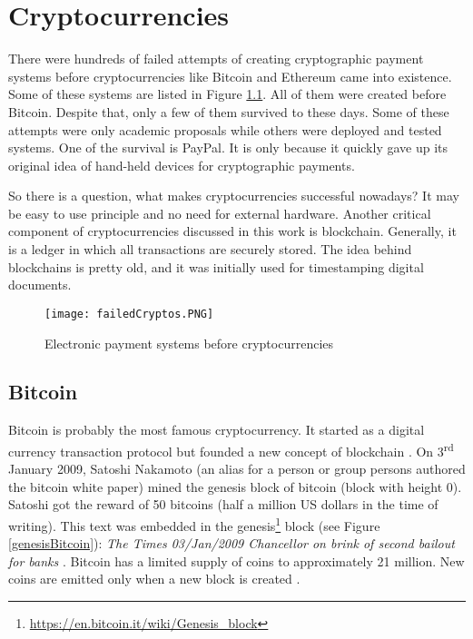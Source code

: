 \chapter{Cryptocurrencies}
\label{Cryptocurrencies}

There were hundreds of failed attempts of creating cryptographic payment systems before cryptocurrencies like Bitcoin and Ethereum came into existence. Some of these systems are listed in Figure \ref{paymentSystems}. All of them were created before Bitcoin. Despite that, only a few of them survived to these days. Some of these attempts were only academic proposals while others were deployed and tested systems. One of the survival is PayPal. It is only because it quickly gave up its original idea of hand-held devices for cryptographic payments. \cite{wayner1997digital}

So there is a question, what makes cryptocurrencies successful nowadays?  It may be easy to use principle and no need for external hardware. 
Another critical component of cryptocurrencies discussed in this work is blockchain. Generally, it is a ledger in which all transactions are securely stored. The idea behind blockchains is pretty old, and it was initially used for timestamping digital documents. \cite{haber1990time} 


\begin{figure}[h]
    \centering
    \texttt{[image: failedCryptos.PNG]}
    \caption{Electronic payment systems before cryptocurrencies \cite{narayanan2016bitcoin}}
    \label{paymentSystems}
\end{figure}


\section{Bitcoin}
Bitcoin is probably the most famous cryptocurrency. It started as a digital currency transaction protocol but founded a new concept of blockchain \cite{ChowdhuryNiaz2020Ibba}. On 3\textsuperscript{rd} January 2009, Satoshi Nakamoto (an alias for a person or group persons authored the bitcoin white paper) mined the genesis block of bitcoin (block with height 0). Satoshi got the reward of 50 bitcoins (half a million US dollars in the time of writing). This text was embedded in the genesis\footnote{\url{https://en.bitcoin.it/wiki/Genesis\_block}} block (see Figure \ref{genesisBitcoin}): \textit{The Times 03/Jan/2009 Chancellor on brink of second bailout for banks} \cite{newYorkerBTC}. Bitcoin has a limited supply of coins to approximately 21 million. New coins are emitted only when a new block is created \cite{nakamoto2008peer}.

